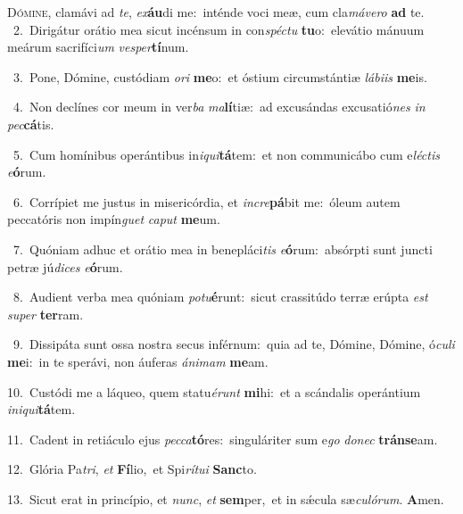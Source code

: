 \lettrine{\initial\textcolor{\initialcolor}{D}}{ómine,} clamávi ad \textit{te}\-, \textit{ex}\-\textbf{áu}di me:~\star inténde voci meæ, cum cla\-\textit{má}\-\textit{ve}\textit{ro} \textbf{ad} te.\\
{\numbfont\textcolor{\numbcolor}{~2.}}~Dirigátur orátio mea sicut incénsum in con\-\textit{spéc}\-\textit{tu} \textbf{tu}\-o:~\star elevátio mánuum meárum sacrifíci\textit{um} \textit{ves}\-\textit{per}\textbf{tí}num.\par
{\numbfont\textcolor{\numbcolor}{~3.}}~Pone, Dómine, custódiam \textit{o}\-\textit{ri} \textbf{me}\-o:~\star et óstium circumstántiæ \textit{lá}\-\textit{bi}\textit{is} \textbf{me}\-is.\par
{\numbfont\textcolor{\numbcolor}{~4.}}~Non declínes cor meum in ver\textit{ba} \textit{ma}\-\textbf{lí}tiæ:~\star ad excusándas excusatió\textit{nes} \textit{in} \textit{pec}\-\textbf{cá}tis.\par
{\numbfont\textcolor{\numbcolor}{~5.}}~Cum homínibus operántibus in\-\textit{i}\-\textit{qui}\textbf{tá}tem:~\star et non communicábo cum e\-\textit{léc}\-\textit{tis} \textit{e}\-\textbf{ó}rum.\par
{\numbfont\textcolor{\numbcolor}{~6.}}~Corrípiet me justus in misericórdia, et \textit{in}\-\textit{cre}\textbf{pá}bit me:~\star óleum autem peccatóris non impín\textit{guet} \textit{ca}\-\textit{put} \textbf{me}\-um.\par
{\numbfont\textcolor{\numbcolor}{~7.}}~Quóniam adhuc et orátio mea in benepláci\textit{tis} \textit{e}\-\textbf{ó}rum:~\star absórpti sunt juncti petræ jú\-\textit{di}\-\textit{ces} \textit{e}\-\textbf{ó}rum.\par
{\numbfont\textcolor{\numbcolor}{~8.}}~Audient verba mea quóniam \textit{pot}\-\textit{u}\textbf{é}runt:~\star sicut crassitúdo terræ erúpta \textit{est} \textit{su}\-\textit{per} \textbf{ter}\-ram.\par
{\numbfont\textcolor{\numbcolor}{~9.}}~Dissipáta sunt ossa nostra secus inférnum:~\dagger quia ad te, Dómine, Dómine, ó\-\textit{cu}\-\textit{li} \textbf{me}\-i:~\star in te sperávi, non áuferas \textit{á}\-\textit{ni}\textit{mam} \textbf{me}\-am.\par
{\numbfont\textcolor{\numbcolor}{10.}}~Custódi me a láqueo, quem statu\-\textit{é}\-\textit{runt} \textbf{mi}\-hi:~\star et a scándalis operántium \textit{in}\-\textit{i}\textit{qui}\textbf{tá}tem.\par
{\numbfont\textcolor{\numbcolor}{11.}}~Cadent in retiáculo ejus \textit{pec}\-\textit{ca}\textbf{tó}res:~\star singuláriter sum e\textit{go} \textit{do}\-\textit{nec} \textbf{tráns}\-\textbf{e}am.\par
{\numbfont\textcolor{\numbcolor}{12.}}~Glória Pa\-\textit{tri}\-, \textit{et} \textbf{Fí}\-lio,~\star et Spi\-\textit{rí}\-\textit{tu}\textit{i} \textbf{Sanc}\-to.\par
{\numbfont\textcolor{\numbcolor}{13.}}~Sicut erat in princípio, et \textit{nunc}\-, \textit{et} \textbf{sem}\-per,~\star et in sǽcula sæ\-\textit{cu}\-\textit{ló}\textit{rum}. \textbf{A}\-men.\par
